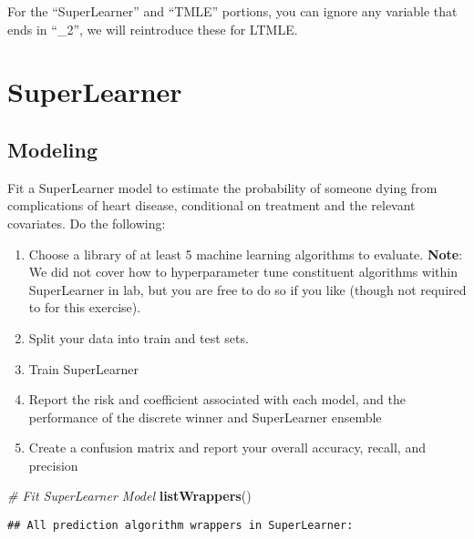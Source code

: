 \documentclass[
]{article}
\newenvironment{Shaded}{\begin{snugshade}}{\end{snugshade}}
\newcommand{\CommentTok}[1]{\textcolor[rgb]{0.56,0.35,0.01}{\textit{#1}}}
\newcommand{\FunctionTok}[1]{\textcolor[rgb]{0.13,0.29,0.53}{\textbf{#1}}}
\newcommand{\NormalTok}[1]{#1}
\begin{document}
For the ``SuperLearner'' and ``TMLE'' portions, you can ignore any
variable that ends in ``\_2'', we will reintroduce these for LTMLE.

\hypertarget{superlearner}{%
\section{SuperLearner}\label{superlearner}}

\hypertarget{modeling}{%
\subsection{Modeling}\label{modeling}}

Fit a SuperLearner model to estimate the probability of someone dying
from complications of heart disease, conditional on treatment and the
relevant covariates. Do the following:

\begin{enumerate}
    \item Choose a library of at least 5 machine learning algorithms to evaluate. \textbf{Note}: We did not cover how to hyperparameter tune constituent algorithms within SuperLearner in lab, but you are free to do so if you like (though not required to for this exercise). 
    \item Split your data into train and test sets.
    \item Train SuperLearner
    \item Report the risk and coefficient associated with each model, and the performance of the discrete winner and SuperLearner ensemble
    \item Create a confusion matrix and report your overall accuracy, recall, and precision
\end{enumerate}

\begin{Shaded}
\begin{Highlighting}[]
\CommentTok{\# Fit SuperLearner Model}
\FunctionTok{listWrappers}\NormalTok{()}
\end{Highlighting}
\end{Shaded}

\begin{verbatim}
## All prediction algorithm wrappers in SuperLearner:
\end{verbatim}
\end{document}
